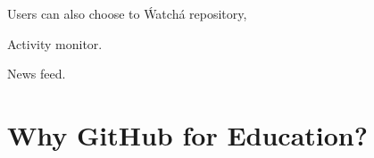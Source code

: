 Users can also choose to \'Watch\' a repository, 

Activity monitor.

News feed.

\section{Why GitHub for Education?}
